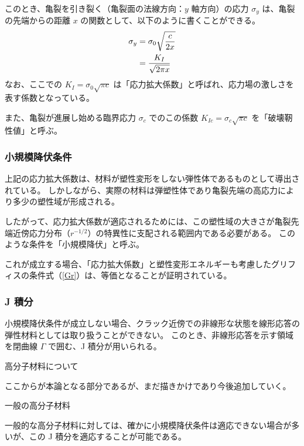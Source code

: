 \documentclass[11pt,a4paper]{jsarticle}
\makeatletter
\def\section{\@startsection 
{section}
{1}
{\z@}
{3.5ex plus -1ex minus -.2ex}
{1.5ex plus .2ex}
{\large\bf}
}
\def\subsection{\@startsection 
{subsection}
{1}
{\z@}
{3.5ex plus -1ex minus -.2ex}
{1.ex plus .2ex}
{\large\bf}
}
\makeatother
\begin{document}
このとき、亀裂を引き裂く（亀裂面の法線方向：$y$ 軸方向）の応力 $\sigma_y$ は、亀裂の先端からの距離 $x$ の関数として、以下のように書くことができる。
\begin{align}
\sigma_y 
	&= \sigma_0\sqrt{\dfrac{c}{2x}} \notag \\
	&= \dfrac{K_I}{\sqrt{2\pi x}}
\end{align}
なお、ここでの $K_I=\sigma_0 \sqrt{\pi c}$ は「応力拡大係数」と呼ばれ、応力場の激しさを表す係数となっている。

また、亀裂が進展し始める臨界応力 $\sigma_c$ でのこの係数 $K_{Ic}=\sigma_c \sqrt{\pi c}$ を「破壊靭性値」と呼ぶ。

\subsubsection{小規模降伏条件}

上記の応力拡大係数は、材料が塑性変形をしない弾性体であるものとして導出されている。
しかしながら、実際の材料は弾塑性体であり亀裂先端の高応力により多少の塑性域が形成される。

したがって、応力拡大係数が適応されるためには、この塑性域の大きさが亀裂先端近傍応力分布（$r^{-1/2}$）の特異性に支配される範囲内である必要がある。
このような条件を「小規模降伏」と呼ぶ。

これが成立する場合、「応力拡大係数」と塑性変形エネルギーも考慮したグリフィスの条件式（\eqref{Gr}）は、等価となることが証明されている。

\subsubsection{J 積分}

小規模降伏条件が成立しない場合、クラック近傍での非線形な状態を線形応答の弾性材料としては取り扱うことができない。
このとき、非線形応答を示す領域を閉曲線 $\Gamma$ で囲む、J 積分が用いられる。


\section{高分子材料について}

\color{red}
ここからが本論となる部分であるが、まだ描きかけであり今後追加していく。


\subsection{一般の高分子材料}

一般的な高分子材料に対しては、確かに小規模降伏条件は適応できない場合が多いが、この J 積分を適応することが可能である。
\end{document}
